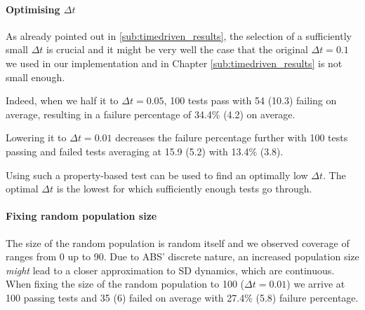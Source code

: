 \paragraph{Optimising $\Delta t$}
As already pointed out in \ref{sub:timedriven_results}, the selection of a sufficiently small $\Delta t$ is crucial and it might be very well the case that the original $\Delta t = 0.1$ we used in our implementation and in Chapter \ref{sub:timedriven_results} is not small enough. 

Indeed, when we half it to $\Delta t = 0.05$, 100 tests pass with 54 (10.3) failing on average, resulting in a failure percentage of 34.4\% (4.2) on average.

Lowering it to $\Delta t = 0.01$ decreases the failure percentage further with 100 tests passing and failed tests averaging at 15.9 (5.2) with 13.4\% (3.8).
%
%

Using such a property-based test can be used to find an optimally low $\Delta t$. The optimal $\Delta t$ is the lowest for which sufficiently enough tests go through.

\paragraph{Fixing random population size}
The size of the random population is random itself and we observed coverage of ranges from 0 up to 90. Due to ABS' discrete nature, an increased population size \textit{might} lead to a closer approximation to SD dynamics, which are continuous. When fixing the size of the random population to 100 ($\Delta t = 0.01$) we arrive at 100 passing tests and 35 (6) failed on average with 27.4\% (5.8) failure percentage.

